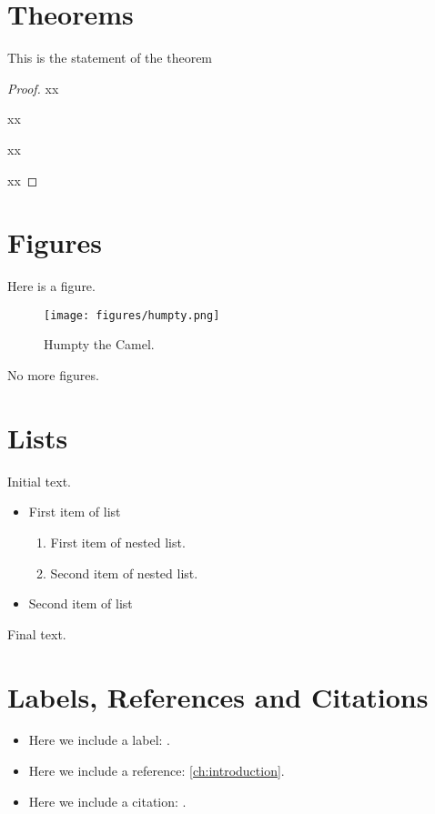 \documentclass{../../../texmf/camel}
\begin{document}
\chapter{Theorems}\label{ch:theorems}

\begin{theorem}
This is the statement of the theorem
\end{theorem}

\begin{proof}
xx

xx

xx

xx
\end{proof}

%
%

\chapter{Figures}\label{ch:figures}

Here is a figure.
\begin{figure}[htb]
\centering
\texttt{[image: figures/humpty.png]}
\caption{Humpty the Camel.}
\label{humpty-the-camel}
\end{figure}
No more figures.

\chapter{Lists}\label{ch:lists}

Initial text.
\begin{itemize}
\item First item of list
\begin{enumerate}
\item First item of nested list.
\item Second item of nested list.
\end{enumerate}
\item Second item of list
\end{itemize}
Final text.

\chapter{Labels, References and Citations}

\begin{itemize}
\item Here we include a label: \label{ch:introduction}.
\item Here we include a reference: \ref{ch:introduction}.
\item Here we include a citation: \cite{video_ex.1.1.1}.
\end{itemize}
\end{document}
